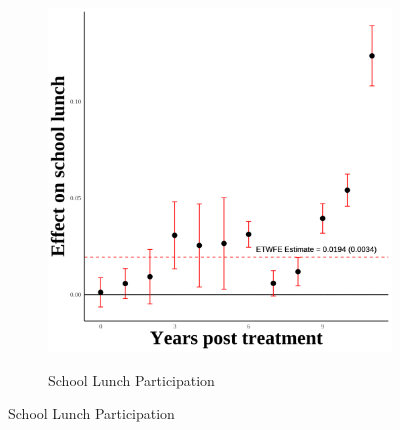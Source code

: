 \documentclass[12pt,english]{article}
\begin{document}
\begin{figure}[H]
\begin{subfigure}[b]{0.3\textwidth}
    \label{fig:ln-schl-lunch}
  \end{subfigure}
  \hfill
  \begin{subfigure}[b]{0.3\textwidth}
    \centering
    \caption{School Lunch Participation}
    \includegraphics[width=\linewidth]{figures/plot03-schl_lunch_event_study.png}
    \label{fig:schl-lunch}
  \end{subfigure}

  \vspace{0.3cm} %


\end{figure}
\end{document}
